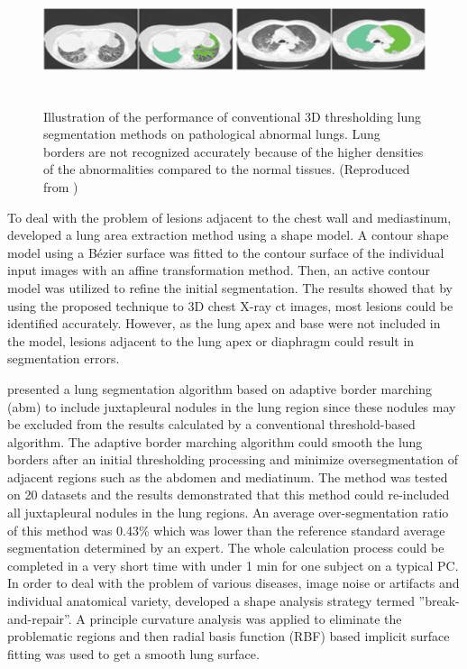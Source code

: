 \begin{figure}[htbp]
  \centering 
  \includegraphics[height=1.5in]{Segmentation/Image/AbnormalLungSegmentation.png}
  \caption{Illustration of the performance of conventional 3D thresholding lung segmentation methods on pathological abnormal lungs. Lung borders are not recognized accurately because of the higher densities of the abnormalities compared to the normal tissues. (Reproduced from \citep{van2013automated})}
  \label{fig:AbnormalLungSegmentation}
\end{figure}

To deal with the problem of lesions adjacent to the chest wall and mediastinum, \citep{kitasaka2003lung} developed a lung area extraction method using a shape model. A contour shape model using a B\'ezier surface was fitted to the contour surface of the individual input images with an affine transformation method. Then, an active contour model was utilized to refine the initial segmentation. The results showed that by using the proposed technique to 3D chest X-ray \gls{ct} images, most lesions could be identified accurately. However, as the lung apex and base were not included in the model, lesions adjacent to the lung apex or diaphragm could result in segmentation errors.

\cite{pu2008adaptive} presented a lung segmentation algorithm based on adaptive border marching (\gls{abm}) to include juxtapleural nodules in the lung region since these nodules may be excluded from the results calculated by a conventional threshold-based algorithm. The adaptive border marching algorithm could smooth the lung borders after an initial thresholding processing and minimize oversegmentation of adjacent regions such as the abdomen and mediatinum. The method was tested on 20 datasets and the results demonstrated that this method could re-included all juxtapleural nodules in the lung regions. An average over-segmentation ratio of this method was 0.43\% which was lower than the reference standard average segmentation determined by an expert. The whole calculation process could be completed in a very short time with under 1 min for one subject on a typical PC. In order to deal with the problem of various diseases, image noise or artifacts and individual anatomical variety, \citep{pu2011shape} developed a shape analysis strategy termed ''break-and-repair''. A principle curvature analysis was applied to eliminate the problematic regions and then radial basis function (RBF) based implicit surface fitting was used to get a smooth lung surface. 

